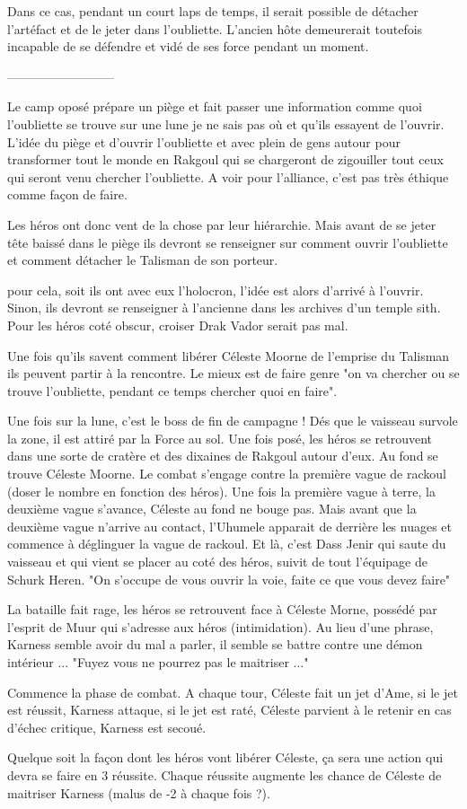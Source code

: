 Dans ce cas, pendant un court laps de temps, il serait possible de détacher l’artéfact et de le jeter dans l’oubliette. L’ancien hôte demeurerait toutefois incapable de se défendre et vidé de ses force pendant un moment.


--------------------------



Le camp oposé prépare un piège et fait passer une information comme quoi l’oubliette se trouve sur une lune je ne sais pas où et qu’ils essayent de l’ouvrir. L’idée du piège et d’ouvrir l’oubliette et avec plein de gens autour pour transformer tout le monde en Rakgoul qui se chargeront de zigouiller tout ceux qui seront venu chercher l’oubliette.
A voir pour l’alliance, c'est pas très éthique comme façon de faire.

Les héros ont donc vent de la chose par leur hiérarchie. Mais avant de se jeter tête baissé dans le piège ils devront se renseigner sur comment ouvrir l'oubliette et comment détacher le Talisman de son porteur.

pour cela, soit ils ont avec eux l'holocron, l'idée est alors d'arrivé à l'ouvrir. Sinon, ils devront se renseigner à l'ancienne dans les archives d'un temple sith. Pour les héros coté obscur, croiser Drak Vador serait pas mal.

Une fois qu'ils savent comment libérer Céleste Moorne de l'emprise du Talisman ils peuvent partir à la rencontre. Le mieux est de faire genre "on va chercher ou se trouve l'oubliette, pendant ce temps chercher quoi en faire".


Une fois sur la lune, c'est le boss de fin de campagne !
Dés que le vaisseau survole la zone, il est attiré par la Force au sol. Une fois posé, les héros se retrouvent dans une sorte de cratère et des dixaines de Rakgoul autour d'eux. Au fond se trouve Céleste Moorne. Le combat s'engage contre la première vague de rackoul (doser le nombre en fonction des héros). Une fois la première vague à terre, la deuxième vague s'avance, Céleste au fond ne bouge pas.
Mais avant que la deuxième vague n'arrive au contact, l'Uhumele apparait de derrière les nuages et commence à déglinguer la vague de rackoul. Et là, c'est Dass Jenir qui saute du vaisseau et qui vient se placer au coté des héros, suivit de tout l'équipage de Schurk Heren. "On s'occupe de vous ouvrir la voie, faite ce que vous devez faire"

La bataille fait rage, les héros se retrouvent face à Céleste Morne, possédé par l'esprit de Muur qui s'adresse aux héros (intimidation). Au lieu d'une phrase, Karness semble avoir du mal a parler, il semble se battre contre une démon intérieur ... "Fuyez vous ne pourrez pas le maitriser ..."

Commence la phase de combat. A chaque tour, Céleste fait un jet d'Ame, si le jet est réussit, Karness attaque, si le jet est raté, Céleste parvient à le retenir en cas d'échec critique, Karness est secoué.

Quelque soit la façon dont les héros vont libérer Céleste, ça sera une action qui devra se faire en 3 réussite. Chaque réussite augmente les chance de Céleste de maitriser Karness (malus de -2 à chaque fois ?). 